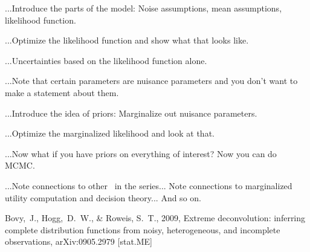 \documentclass[12pt,twoside]{article}
\begin{document}
...Introduce the parts of the model: Noise assumptions, mean assumptions,
likelihood function.

...Optimize the likelihood function and show what that looks like.

...Uncertainties based on the likelihood function alone.

...Note that certain parameters are nuisance parameters and you don't
want to make a statement about them.

...Introduce the idea of priors:  Marginalize out nuisance parameters.

...Optimize the marginalized likelihood and look at that.

...Now what if you have priors on everything of interest?  Now you can do MCMC.

...Note connections to other \documentnames\ in the series...  Note
connections to marginalized utility computation and decision theory...
And so on.

\clearpage
{}\theendnotes

\clearpage
\begin{thebibliography}{}
  Bovy,~J., Hogg,~D.~W., \& Roweis, S.~T., 2009,
  Extreme deconvolution: inferring complete distribution functions from noisy, heterogeneous, and incomplete observations, 
  arXiv:0905.2979 [stat.ME]
\end{thebibliography}
\end{document}
